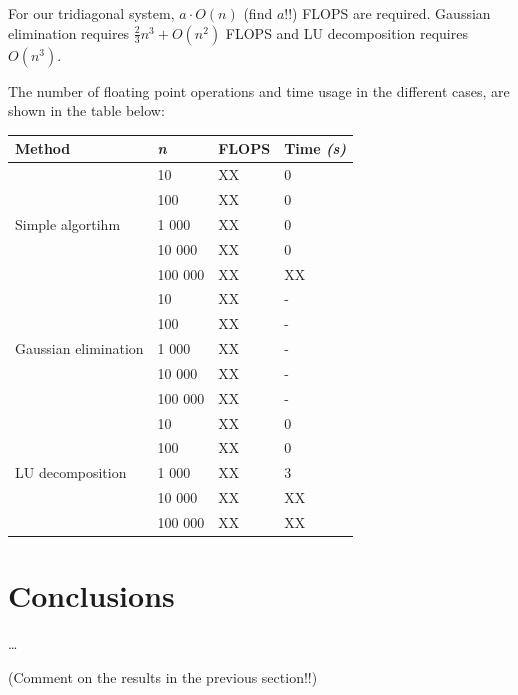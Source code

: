 \documentclass{article}
\begin{document}
\begin{multicols}{2}
For our tridiagonal system, $a\cdot O(n)$ (find $a$!!) FLOPS are required. Gaussian elimination requires $\frac{2}{3}n^3 + O(n^2)$ FLOPS and LU decomposition requires$O(n^3)$. 

The number of floating point operations and time usage in the different cases, are shown in the table below:


\begin{center}
    \begin{tabular}{ l  l  l  l } \hline
    \textbf{Method} 					&\textbf{\textit{n}} 	&\textbf{FLOPS} 	&\textbf{Time \textit{(s)}} \\ \hline
    \multirow{5}{*}{Simple algortihm} 		& 10 				& XX				& 0 \\ 
    								& 100 			& XX 			& 0 \\
    								& 1 000			& XX 			& 0 \\ 
								& 10 000			& XX 			& 0 \\
								& 100 000			& XX 			& XX \\
    \hline
    \multirow{5}{*}{Gaussian elimination} 	& 10				& XX				& - \\ 
    								& 100 			& XX				& - \\
    								& 1 000			& XX 			& - \\ 
								& 10 000			& XX 			& - \\ 
								& 100 000			& XX 			& - \\
    \hline
    \multirow{5}{*}{LU decomposition} 		& 10				& XX				& 0 \\ 
    								& 100			& XX				& 0 \\
    								& 1 000			& XX				& 3 \\ 
								& 10 000			& XX				& XX \\ 
								& 100 000			& XX 			& XX \\
    \hline
    \end{tabular}
\end{center}


\section{Conclusions} \label{sec:conclusions}
\dots

(Comment on the results in the previous section!!)

\end{multicols}
\end{document}
